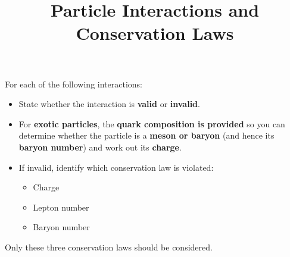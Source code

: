 \documentclass[12pt]{article}
\begin{document}
\title{Particle Interactions and Conservation Laws}
\author{}
\date{}
\maketitle

For each of the following interactions:

\begin{itemize}
\item State whether the interaction is \textbf{valid} or \textbf{invalid}.
\item For \textbf{exotic particles}, the \textbf{quark composition is provided} so you can determine whether the particle is a \textbf{meson or baryon} (and hence its \textbf{baryon number}) and work out its \textbf{charge}.
\item If invalid, identify which conservation law is violated:
\begin{itemize}
\item Charge
\item Lepton number
\item Baryon number
\end{itemize}
\end{itemize}

Only these three conservation laws should be considered.

\vspace{0.5cm}
\end{document}
